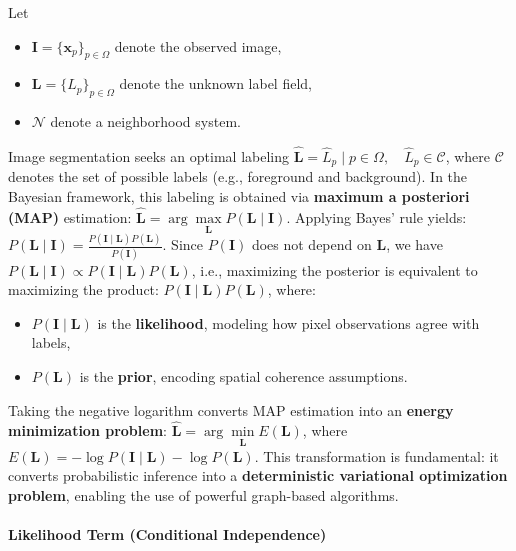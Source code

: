\documentclass[11pt]{article}
\providecommand{\tightlist}{%
      \setlength{\itemsep}{0pt}\setlength{\parskip}{0pt}}
\begin{document}
Let

\begin{itemize}
\tightlist
\item
  \(\mathbf{I} = \{\mathbf{x}_p\}_{p\in\Omega}\) denote the observed
  image,
\item
  \(\mathbf{L} = \{L_p\}_{p\in\Omega}\) denote the unknown label field,
\item
  \(\mathcal{N}\) denote a neighborhood system.
\end{itemize}

Image segmentation seeks an optimal labeling
\(\hat{\mathbf{L}} = { \hat{L}_p \mid p \in \Omega }, \quad \hat{L}_p \in \mathcal{C}\),
where \(\mathcal{C}\) denotes the set of possible labels (e.g.,
foreground and background). In the Bayesian framework, this labeling is
obtained via \textbf{maximum a posteriori (MAP)} estimation:
\(\hat{\mathbf{L}} = \arg\underset{\mathbf{L}}{\max} P(\mathbf{L} \mid \mathbf{I})\).
Applying Bayes' rule yields:
\(P(\mathbf{L} \mid \mathbf{I}) = \frac{P(\mathbf{I} \mid \mathbf{L}) P(\mathbf{L})}{P(\mathbf{I})}\).
Since \(P(\mathbf{I})\) does not depend on \(\mathbf{L}\), we have
\(P(\mathbf{L} \mid \mathbf{I}) \propto P(\mathbf{I} \mid \mathbf{L}) P(\mathbf{L})\),
i.e., maximizing the posterior is equivalent to maximizing the product:
\(P(\mathbf{I} \mid \mathbf{L}) P(\mathbf{L})\), where:

\begin{itemize}
\tightlist
\item
  \(P(\mathbf{I} \mid \mathbf{L})\) is the \textbf{likelihood}, modeling
  how pixel observations agree with labels,
\item
  \(P(\mathbf{L})\) is the \textbf{prior}, encoding spatial coherence
  assumptions.
\end{itemize}

Taking the negative logarithm converts MAP estimation into an
\textbf{energy minimization problem}:
\(\hat{\mathbf{L}} = \arg\underset{\mathbf{L}}{\min} E(\mathbf{L})\),
where
\(E(\mathbf{L}) = -\log P(\mathbf{I} \mid \mathbf{L}) - \log P(\mathbf{L})\).
This transformation is fundamental: it converts probabilistic inference
into a \textbf{deterministic variational optimization problem}, enabling
the use of powerful graph-based algorithms.

\hypertarget{likelihood-term-conditional-independence}{%
\paragraph{\texorpdfstring{\textbf{Likelihood Term (Conditional
Independence)}}{Likelihood Term (Conditional Independence)}}\label{likelihood-term-conditional-independence}}
\end{document}
